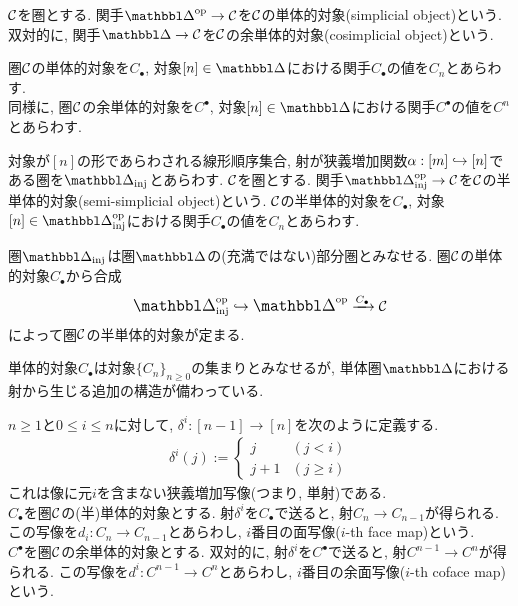 \documentclass[uplatex, a4paper, 14Q, dvipdfmx]{jsreport}
\begin{document}
\begin{definition}
  $\mathcal{C}$を圏とする.
  関手$\simop \to \calC$を$\mathcal{C}$の単体的対象(simplicial object)という. \\
  双対的に, 関手$\csim \to \calC$を$\mathcal{C}$の余単体的対象(cosimplicial object)という. 
\end{definition}

\begin{nota}
  圏$\mathcal{C}$の単体的対象を$C_{\bullet}$, 対象$[n] \in \csim$における関手$C_{\bullet}$の値を$C_n$とあらわす. \\
  同様に, 圏$\mathcal{C}$の余単体的対象を$C^{\bullet}$, 対象$[n] \in \csim$における関手$C^{\bullet}$の値を$C^n$とあらわす. 
\end{nota} 

\begin{definition}
  対象が$[n]$の形であらわされる線形順序集合, 射が狭義増加関数$\alpha: [m] \hookrightarrow [n]$である圏を$\insim$とあらわす. 
  $\mathcal{C}$を圏とする. 
  関手$\insimop \to \calC$を$\mathcal{C}$の半単体的対象(semi-simplicial object)という. 
  $\mathcal{C}$の半単体的対象を$C_{\bullet}$, 対象$[n] \in \insimop$における関手$C_{\bullet}$の値を$C_n$とあらわす. 
\end{definition}

\begin{remark}
  圏$\insim$は圏$\csim$の(充満ではない)部分圏とみなせる. 
  圏$\mathcal{C}$の単体的対象$C_{\bullet}$から合成
  \begin{align*}
    \insimop \hookrightarrow \simop \xr{C_{\bullet}} \calC
  \end{align*}
  によって圏$\mathcal{C}$の半単体的対象が定まる.
\end{remark}

単体的対象$C_{\bullet}$は対象$\{C_n\}_{n \geq 0}$の集まりとみなせるが, 単体圏$\csim$における射から生じる追加の構造が備わっている. 

\begin{nota}
  $n \geq 1$と$0 \leq i \leq n$に対して, $\delta^i: [n-1] \to [n]$を次のように定義する.
  \begin{align*}
    \delta^i(j) :=
    \begin{cases}
      j & (j < i) \\
      j+1 & (j \geq i)
    \end{cases}
  \end{align*} 
  これは像に元$i$を含まない狭義増加写像(つまり, 単射)である. \\
  $C_{\bullet}$を圏$\mathcal{C}$の(半)単体的対象とする. 
  射$\delta^i$を$C_{\bullet}$で送ると, 射$C_n \to C_{n-1}$が得られる. 
  この写像を$d_i: C_n \to C_{n-1}$とあらわし, $i$番目の面写像($i$-th face map)という. \\
  $C^{\bullet}$を圏$\mathcal{C}$の余単体的対象とする. 
  双対的に, 射$\delta^i$を$C^{\bullet}$で送ると, 射$C^{n-1} \to C^n$が得られる. 
  この写像を$d^i: C^{n-1} \to C^n$とあらわし, $i$番目の余面写像($i$-th coface map)という.
\end{nota}
\end{document}
